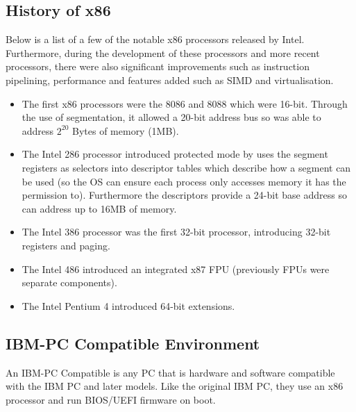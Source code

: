 \documentclass{article}
\newcommand{\layout}[1]{\parbox{\linewidth}{#1}}
\begin{document}
\layout{
  \subsection{History of x86}

  Below is a list of a few of the notable x86 processors released by Intel.
  Furthermore, during the development of these processors and more recent processors, there were also significant improvements such as instruction pipelining, performance and features added such as SIMD and virtualisation.

  \begin{itemize}
    \item The first x86 processors were the 8086 and 8088 which were 16-bit.
      Through the use of segmentation, it allowed a 20-bit address bus so was able to address $2^{20}$ Bytes of memory (1MB).
    \item The Intel 286 processor introduced protected mode by uses the segment registers as selectors into descriptor tables which describe how a segment can be used (so the OS can ensure each process only accesses memory it has the permission to).
      Furthermore the descriptors provide a 24-bit base address so can address up to 16MB of memory.
    \item The Intel 386 processor was the first 32-bit processor, introducing 32-bit registers and paging.
    \item The Intel 486 introduced an integrated x87 FPU (previously FPUs were separate components).
    \item The Intel Pentium 4 introduced 64-bit extensions.
  \end{itemize}

  \cite[Chapter~2.1]{sdm1}
}


\layout{
  \subsection{IBM-PC Compatible Environment}

  An IBM-PC Compatible is any PC that is hardware and software compatible with the IBM PC and later models.
  Like the original IBM PC, they use an x86 processor and run BIOS/UEFI firmware on boot.

  \bigskip \cite{ibm-compatible}
}
\end{document}

